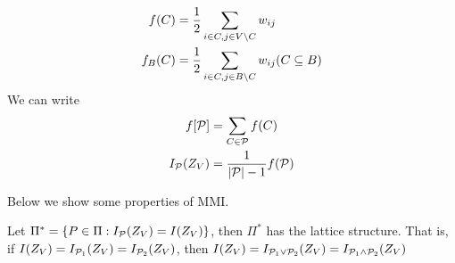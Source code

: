\documentclass{article}
\begin{document}
\begin{align}
f(C) & = {1\over 2}\sum_{i\in C, j \in V\backslash C} w_{ij} \\
f_B(C) & = {1\over 2}\sum_{i\in C, j \in B\backslash C} w_{ij} (C \subseteq B) \\
\end{align}
We can write 
\begin{align}
f[\P] & = \sum_{C \in \P} f(C) \\
I_{\mathcal{P}}(Z_V)  &= { 1 \over \abs{\P}  - 1}f(\P) 
\end{align}

Below we show some properties of MMI.





\begin{theorem}\label{thm:lattice}
Let $\Pi^* =  \{ P \in \Pi: I_{\P}(Z_V) = I(Z_V)\}$, then $\Pi^*$ has the lattice structure. That is, 
if $I(Z_V) = I_{\P_1}(Z_V) = I_{\P_2}(Z_V)$, then $I(Z_V) 
=  I_{\P_1 \vee \P_2}(Z_V) = 
 I_{\P_1 \wedge \P_2}(Z_V)$
\end{theorem}
\end{document}
